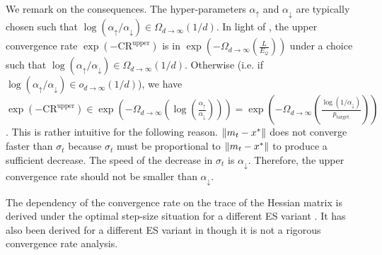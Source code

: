 \documentclass[journal]{IEEEtran}
\DeclarePairedDelimiter{\norm}{\lVert}{\rVert}
\theoremstyle{definition}
\newcommand{\aup}{\alpha_{\uparrow}}
\newcommand{\adown}{\alpha_{\downarrow}}
\begin{document}
{
    We remark on the consequences.
    The hyper-parameters $\aup$ and $\adown$ are typically chosen such that $\log(\aup / \adown)\in\Omega_{d \to \infty}(1/d)$.
    In light of , the upper convergence rate $\exp\left(-\mathrm{CR}^\mathrm{upper}\right)$ is in $ \exp\left(- \Omega_{d \to \infty}\left(\frac{L}{E_\mathcal{Q}} \right)\right)$ under a choice such that $\log(\aup / \adown) \in \Omega_{d \to \infty}(1/d)$.
    Otherwise (i.e. if $\log(\aup / \adown) \in o_{d \to \infty}(1/d)$), we have $\exp\left(-\mathrm{CR}^\mathrm{upper}\right) \in\exp\left(- \Omega_{d \to \infty}\left(\log\left(\frac{\aup}{\adown}\right) \right)\right) = \exp\left(-\Omega_{d \to \infty}\left(\frac{\log\left( 1/\adown\right)}{p_\mathrm{target}}\right)\right)$.
    This is rather intuitive for the following reason. $\norm{m_t - x^*}$ does not converge faster than $\sigma_t$ because $\sigma_t$ must be proportional to $\norm{m_t - x^*}$ to produce a sufficient decrease. The speed of the decrease in $\sigma_t$ is $\adown$. Therefore, the upper convergence rate should not be smaller than $\adown$.

The dependency of the convergence rate on the trace of the Hessian matrix is derived under the optimal step-size situation for a different ES variant \cite{akimoto2020tcs}. It has also been derived for a different ES variant in \cite{beyer2013dynamics} though it is not a rigorous convergence rate analysis.}
\end{document}
